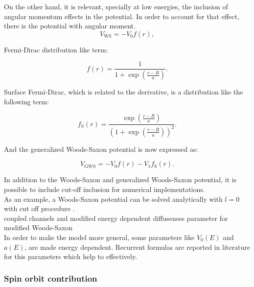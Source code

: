 \documentclass[openany]{book}
\begin{document}
On the other hand, it is relevant, specially at low energies, the inclusion of angular momentum effects in the potential. In order to account for that effect, there is the potential with angular moment. \\

\begin{equation} \label{eq:potential_WoodsSaxon2}
	V_{\mathrm{WS}} = -V_0 f(r),
\end{equation}

Fermi-Dirac distribution like term: 

\begin{equation}  \label{eq:potential_WoodsSaxon2_fermiDirac}
	f(r) = \frac{1}{1 + \exp {\left(\frac{r- R}{a}\right)}}.
\end{equation}

Surface Fermi-Dirac, which is related to the derivative, is a distribution like the following term: 

\begin{equation}  \label{eq:potential_WoodsSaxon2_surfaceFermiDirac}
	f_{\mathrm{S}}(r) = \frac{\exp{\left(\frac{r - R}{a}\right)}}{\left(1 + \exp {\left(\frac{r- R}{a}\right)}\right)^2}.
\end{equation}

And the generalized Woods-Saxon potential is now expressed as: 

\begin{equation} \label{eq:potential_GeneralWoodsSaxon}
	V_{\mathrm{GWS}} = -V_0 f(r) - V_1 	f_{\mathrm{S}}(r).
\end{equation}

In addition to the Woods-Saxon and generalized Woods-Saxon potential, it is possible to include cut-off inclusion for numerical implementations. \\

As an example, a Woods-Saxon potential can be solved analytically with $l = 0$ with cut off procedure \cite{salamon_baran_vertse_2016}. \\

coupled channels and modified energy dependent diffuseness parameter for modified Woods-Saxon \cite{singh_sukhvinder_kharab_2013A} \\


In order to make the model more general, some parameters like $V_0(E)$ and $a(E)$, are made energy dependent. Recurrent formulas are reported in literature for this parameters which help to effectively.

\subsubsection{Spin orbit contribution} \label{sub:potential_effective_spinOrbit}
\end{document}
